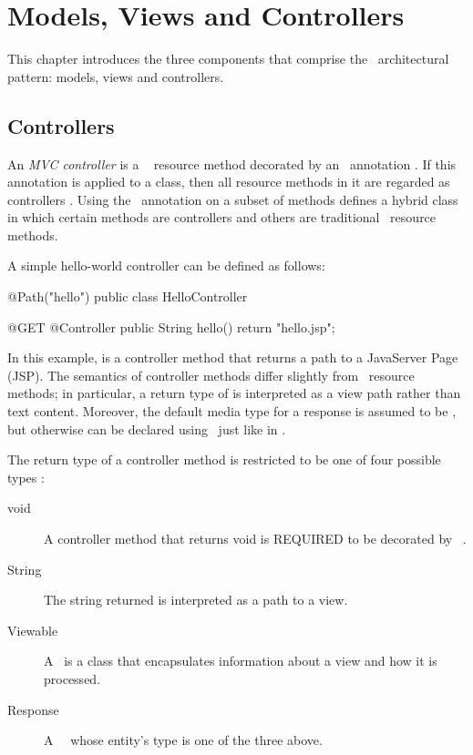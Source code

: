 \chapter{Models, Views and Controllers}
\label{mvc}

This chapter introduces the three components that comprise the \mvc\ architectural 
pattern: models, views and controllers. 

\section{Controllers}
\label{controllers}

An {\em MVC controller} is a \jaxrs\ \cite{jaxrs} resource method decorated by 
an \Controller\ annotation . 
If this annotation is applied to a class, then all resource methods in it are regarded as controllers
. 
Using the \Controller\ annotation on a subset of methods defines a hybrid class in which 
certain methods are controllers and others are traditional \jaxrs\ resource methods.

A simple hello-world controller can be defined as follows:

\begin{listing}{1}
@Path("hello")
public class HelloController {

    @GET
    @Controller
    public String hello() {
        return "hello.jsp";
    }
}
\end{listing}

In this example,  is a controller method that returns a path to a JavaServer Page (JSP).
The semantics of controller methods differ slightly from \jaxrs\ resource methods; in particular, a
return type of  is interpreted as a view path rather than text content. Moreover,
the default media type for a response is assumed to be , but otherwise can
be declared using \Produces\ just like in \jaxrs.

The return type of a controller method is restricted to be one of four possible types
:
\begin{description}
\item[void] A controller method that returns void is REQUIRED to be decorated by \View\
. 
\item[String] The string returned is interpreted as a path to a view. 
\item[Viewable] A \Viewable\ is a class that encapsulates information about a view and
how it is processed.
\item[Response] A \jaxrs\ \Response\ whose entity's type is one of the three above.
\end{description}

